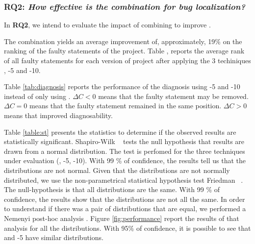 \documentclass{article}
\begin{document}

\subsubsection{RQ2: \textit{How effective is the \comb{} combination for bug localization?}}


In \textbf{RQ2}, we intend to evaluate the impact of combining \ds{} to improve \ds{}.

The \comb{} combination yields an average improvement of, approximately, 19\% on the ranking of the faulty statements of the \chart{}
project. Table , reports the average rank of all faulty statements for each version of \chart{} project after
applying the 3 techiniques \sfl{}, \comb{}-5 and \comb{}-10.

Table \ref{tab:diagnosis} reports the performance of the diagnosis using \comb{}-5 and \comb{}-10 instead of only using \sfl{}. $\Delta C <0$ means that the faulty statement may be removed. $\Delta C=0$ means that the faulty statement remained in the same position. $\Delta C >0$ means that \ds{} improved diagnosability.


Table \ref{table:st} presents the statistics to determine if the observed results are statistically significant. Shapiro-Wilk ~\cite{10.2307/2333709} tests the null hypothesis that results are drawn from a normal distribution. The test is perfomed for the three techniques under evaluation (\sfl{}, \comb{}-5, \comb{}-10). With 99 \% of confidence, the results tell us that the distributions are not normal. Given that the distributions are not normally distributed, we use the non-parametrical statistical hypothesis test Friedman ~\cite{10.2307/2279372}. The null-hypothesis is that all distributions are the same. With 99 \% of confidence, the results show that the distributions are not all the same. In order to understand if there was a pair of distributions that are equal, we performed a Nemenyi post-hoc analysis . Figure \ref{fig:performance} report the results of that analysis for all the distributions. With 95\% of confidence, it is possible to see that \sfl{} and \comb{}-5 have similar distributions.
\end{document}
